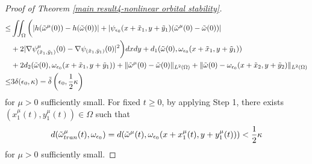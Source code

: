 \documentclass[1 [leqno, 11pt]{amsart}
\numberwithin{equation}{section}
\let\ep=\epsilon
\begin{document}
\begin{CJK*}{GBK}{song}
\begin{proof}[Proof of  Theorem \ref{main result4-nonlinear orbital stability}]
\begin{align*}
\leq&\iint_\Omega\bigg(|h(\tilde \omega^\mu(0))-h(\tilde \omega(0))|+|\psi_{\ep_0}(x+\tilde x_1,y+\tilde y_1)(\tilde \omega^\mu(0)-\tilde \omega(0))|\\
&+2|\nabla\psi_{(\tilde x_1,\tilde y_1)}^\mu(0)-\nabla\psi_{(\tilde x_1,\tilde y_1)}(0)|^2\bigg)dxdy
+d_1(\tilde \omega(0),\omega_{\ep_0}(x+\tilde x_1,y+\tilde y_1))\\
&+2d_2(\tilde \omega(0),\omega_{\ep_0}(x+\tilde x_1,y+\tilde y_1))+\|\tilde \omega^\mu(0)- \tilde \omega(0)\|_{L^2(\Omega)}+
\|\tilde \omega(0)-\omega_{\ep_0}(x+\tilde x_2,y+\tilde y_2)\|_{L^2(\Omega)}\\
\leq &3\delta(\ep_0,\kappa)=\tilde\delta\left(\ep_0,{1\over2}\kappa\right)
\end{align*}
for $\mu>0$ sufficiently small.
For fixed  $t\geq0$, by applying  Step 1, there exists $(x_1^\mu(t),y_1^\mu(t))\in\Omega$ such that
\begin{align}\label{onlinear orbital stability-apply1}
d(\tilde \omega_{tran}^\mu(t),\omega_{\ep_0})=d(\tilde \omega^\mu(t),\omega_{\ep_0}(x+x_1^\mu(t),y+y_1^\mu(t)))<{1\over2}\kappa
\end{align}
for $\mu>0$ sufficiently small.


\end{proof}
\end{CJK*}
\end{document}

